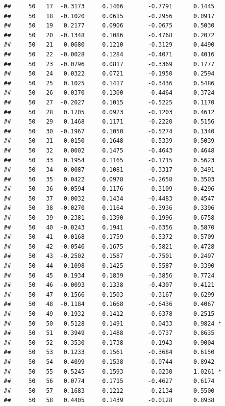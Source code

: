 \documentclass[
]{article}
\begin{document}
\begin{verbatim}
##     50   17  -0.3173     0.1466       -0.7791      0.1445  
##     50   18  -0.1020     0.0615       -0.2956      0.0917  
##     50   19   0.2177     0.0906       -0.0675      0.5030  
##     50   20  -0.1348     0.1086       -0.4768      0.2072  
##     50   21   0.0680     0.1210       -0.3129      0.4490  
##     50   22  -0.0028     0.1284       -0.4071      0.4016  
##     50   23  -0.0796     0.0817       -0.3369      0.1777  
##     50   24   0.0322     0.0721       -0.1950      0.2594  
##     50   25   0.1025     0.1417       -0.3436      0.5486  
##     50   26  -0.0370     0.1300       -0.4464      0.3724  
##     50   27  -0.2027     0.1015       -0.5225      0.1170  
##     50   28   0.1705     0.0923       -0.1203      0.4612  
##     50   29   0.1468     0.1171       -0.2220      0.5156  
##     50   30  -0.1967     0.1050       -0.5274      0.1340  
##     50   31  -0.0150     0.1648       -0.5339      0.5039  
##     50   32   0.0002     0.1475       -0.4643      0.4648  
##     50   33   0.1954     0.1165       -0.1715      0.5623  
##     50   34   0.0087     0.1081       -0.3317      0.3491  
##     50   35   0.0422     0.0978       -0.2658      0.3503  
##     50   36   0.0594     0.1176       -0.3109      0.4296  
##     50   37   0.0032     0.1434       -0.4483      0.4547  
##     50   38  -0.0270     0.1164       -0.3936      0.3396  
##     50   39   0.2381     0.1390       -0.1996      0.6758  
##     50   40  -0.0243     0.1941       -0.6356      0.5870  
##     50   41   0.0168     0.1759       -0.5372      0.5709  
##     50   42  -0.0546     0.1675       -0.5821      0.4728  
##     50   43  -0.2502     0.1587       -0.7501      0.2497  
##     50   44  -0.1098     0.1425       -0.5587      0.3390  
##     50   45   0.1934     0.1839       -0.3856      0.7724  
##     50   46  -0.0093     0.1338       -0.4307      0.4121  
##     50   47   0.1566     0.1503       -0.3167      0.6299  
##     50   48  -0.1184     0.1668       -0.6436      0.4067  
##     50   49  -0.1932     0.1412       -0.6378      0.2515  
##     50   50   0.5128     0.1491        0.0433      0.9824 *
##     50   51   0.3949     0.1488       -0.0737      0.8635  
##     50   52   0.3530     0.1738       -0.1943      0.9004  
##     50   53   0.1233     0.1561       -0.3684      0.6150  
##     50   54   0.4099     0.1538       -0.0744      0.8942  
##     50   55   0.5245     0.1593        0.0230      1.0261 *
##     50   56   0.0774     0.1715       -0.4627      0.6174  
##     50   57   0.1683     0.1212       -0.2134      0.5500  
##     50   58   0.4405     0.1439       -0.0128      0.8938  

\end{verbatim}
\end{document}
